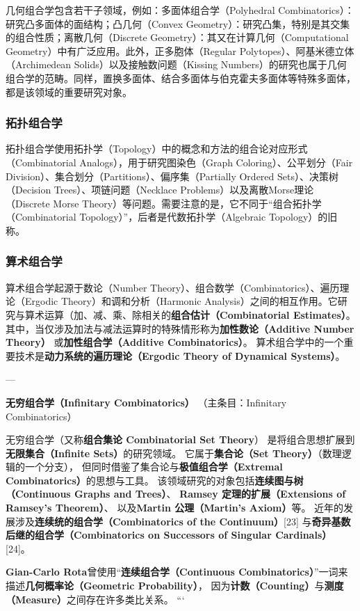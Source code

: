 几何组合学包含若干子领域，例如：多面体组合学（Polyhedral Combinatorics）：研究凸多面体的面结构；凸几何（Convex Geometry）：研究凸集，特别是其交集的组合性质；离散几何（Discrete Geometry）：其又在计算几何（Computational Geometry）中有广泛应用。此外，正多胞体（Regular Polytopes）、阿基米德立体（Archimedean Solids）以及接触数问题（Kissing Numbers）的研究也属于几何组合学的范畴。同样，置换多面体、结合多面体与伯克霍夫多面体等特殊多面体，都是该领域的重要研究对象。
\subsubsection{拓扑组合学}
拓扑组合学使用拓扑学（Topology）中的概念和方法的组合论对应形式（Combinatorial Analogs），用于研究图染色（Graph Coloring）、公平划分（Fair Division）、集合划分（Partitions）、偏序集（Partially Ordered Sets）、决策树（Decision Trees）、项链问题（Necklace Problems）以及离散Morse理论（Discrete Morse Theory）等问题。需要注意的是，它不同于“组合拓扑学（Combinatorial Topology）”，后者是代数拓扑学（Algebraic Topology）的旧称。
\subsubsection{算术组合学}
算术组合学起源于数论（Number Theory）、组合数学（Combinatorics）、遍历理论（Ergodic Theory）和调和分析（Harmonic Analysis）之间的相互作用。它研究与算术运算（加、减、乘、除相关的\textbf{组合估计（Combinatorial Estimates）}。  
其中，当仅涉及加法与减法运算时的特殊情形称为\textbf{加性数论（Additive Number Theory）}  
或\textbf{加性组合学（Additive Combinatorics）}。  
算术组合学中的一个重要技术是\textbf{动力系统的遍历理论（Ergodic Theory of Dynamical Systems）}。

---

\textbf{无穷组合学（Infinitary Combinatorics）}  
（主条目：Infinitary Combinatorics）  

无穷组合学（又称\textbf{组合集论 Combinatorial Set Theory}）  
是将组合思想扩展到\textbf{无限集合（Infinite Sets）}的研究领域。  
它属于\textbf{集合论（Set Theory）}（数理逻辑的一个分支），  
但同时借鉴了集合论与\textbf{极值组合学（Extremal Combinatorics）}的思想与工具。  
该领域研究的对象包括\textbf{连续图与树（Continuous Graphs and Trees）}、  
\textbf{Ramsey 定理的扩展（Extensions of Ramsey’s Theorem）}、  
以及\textbf{Martin 公理（Martin’s Axiom）}等。  
近年的发展涉及\textbf{连续统的组合学（Combinatorics of the Continuum）}[23]  
与\textbf{奇异基数后继的组合学（Combinatorics on Successors of Singular Cardinals）}[24]。

\textbf{Gian-Carlo Rota}曾使用“\textbf{连续组合学（Continuous Combinatorics）}”一词来描述\textbf{几何概率论（Geometric Probability）}，  
因为\textbf{计数（Counting）}与\textbf{测度（Measure）}之间存在许多类比关系。
```









